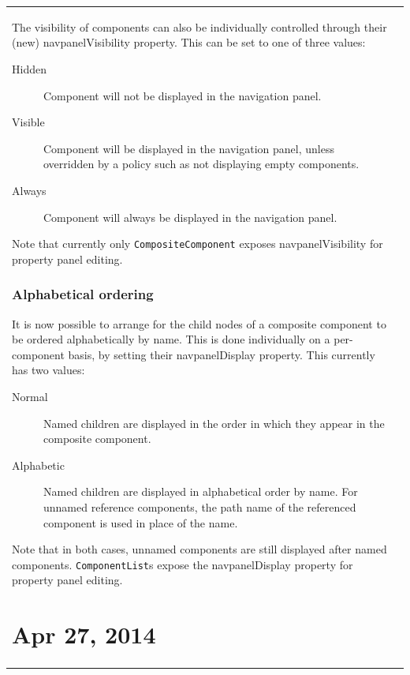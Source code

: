 \documentclass{article}
\begin{document}
\begin{tabular}{ll}
The visibility of components can also be individually controlled
through their (new) {\sf navpanelVisibility} property. This can be set
to one of three values:

\begin{description}

\item[Hidden] Component will not be displayed in the navigation panel.

\item[Visible] Component will be displayed in the navigation panel,
unless overridden by a policy such as not displaying empty components.

\item[Always] Component will always be displayed in the navigation panel.

\end{description}

Note that currently only {\tt CompositeComponent} exposes {\sf
navpanelVisibility} for property panel editing.

\subsubsection*{Alphabetical ordering}

It is now possible to arrange for the child nodes of a composite
component to be ordered alphabetically by name. This is done
individually on a per-component basis, by setting their {\sf
navpanelDisplay} property. This currently has two values:

\begin{description}

\item[Normal] Named children are displayed in the order in which they appear
in the composite component.

\item[Alphabetic] Named children are displayed in alphabetical order
by name. For unnamed reference components, the path name of the
referenced component is used in place of the name.

\end{description}

Note that in both cases, unnamed components are still displayed after
named components. {\tt ComponentList}s expose the {\sf navpanelDisplay}
property for property panel editing.

\section*{Apr 27, 2014}


\end{tabular}
\end{document}
